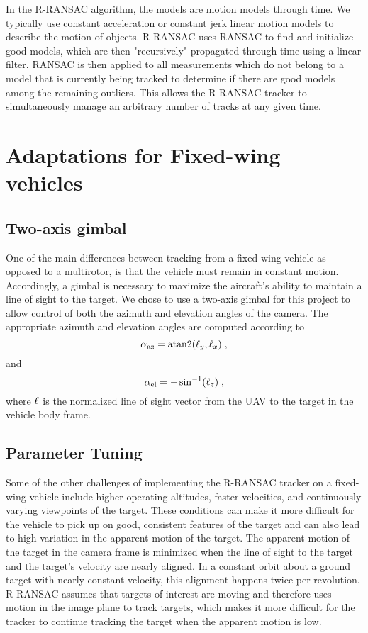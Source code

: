In the R-RANSAC algorithm, the models are motion models through time. We typically use constant acceleration or constant jerk linear motion models to describe the motion of objects. R-RANSAC uses RANSAC to find and initialize good models, which are then "recursively" propagated through time using a linear filter. RANSAC is then applied to all measurements which do not belong to a model that is currently being tracked to determine if there are good models among the remaining outliers. This allows the R-RANSAC tracker to simultaneously manage an arbitrary number of tracks at any given time.

\section{Adaptations for Fixed-wing vehicles}
\subsection{Two-axis gimbal}
One of the main differences between tracking from a fixed-wing vehicle as opposed to a multirotor, is that the vehicle must remain in constant motion. Accordingly, a gimbal is necessary to maximize the aircraft's ability to maintain a line of sight to the target. We chose to use a two-axis gimbal for this project to allow control of both the azimuth and elevation angles of the camera. The appropriate azimuth and elevation angles are computed according to
\begin{equation}
  \alpha_\text{az} = \text{atan2}({\mathbf{\ell}}_y, {\mathbf{\ell}}_x)\;,
\end{equation}
and
\begin{equation}
  \alpha_\text{el} = -\sin^{-1}({\mathbf{\ell}}_z)\;,
\end{equation}
where ${\mathbf{\ell}}$ is the normalized line of sight vector from the UAV to the target in the vehicle body frame.

\subsection{Parameter Tuning}
Some of the other challenges of implementing the R-RANSAC tracker on a fixed-wing vehicle include higher operating altitudes, faster velocities, and continuously varying viewpoints of the target.
These conditions can make it more difficult for the vehicle to pick up on good, consistent features of the target and can also lead to high variation in the apparent motion of the target.
The apparent motion of the target in the camera frame is minimized when the line of sight to the target and the target's velocity are nearly aligned.
In a constant orbit about a ground target with nearly constant velocity, this alignment happens twice per revolution.
R-RANSAC assumes that targets of interest are moving and therefore uses motion in the image plane to track targets, which makes it more difficult for the tracker to continue tracking the target when the apparent motion is low.

